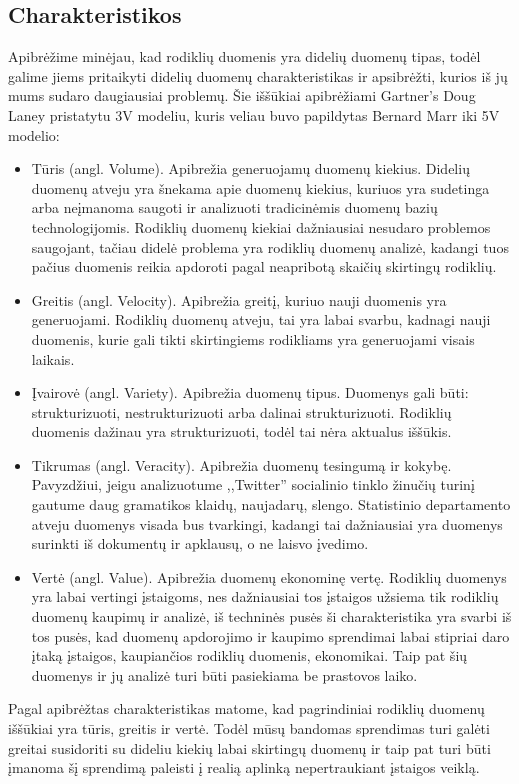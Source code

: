 \documentclass{VUMIFPSkursinis}
\begin{document}
\subsection{Charakteristikos}

Apibrėžime minėjau, kad rodiklių duomenis yra didelių duomenų tipas, todėl galime jiems pritaikyti didelių duomenų charakteristikas ir apsibrėžti, kurios iš jų 
mums sudaro daugiausiai problemų. Šie iššūkiai apibrėžiami Gartner's Doug Laney pristatytu 3V modeliu\cite{laney20013d}, kuris veliau buvo papildytas Bernard Marr iki 5V modelio\cite{marr2014big}:
\begin{itemize}
    \item Tūris (angl. Volume). Apibrežia generuojamų duomenų kiekius. Didelių duomenų atveju yra šnekama apie duomenų kiekius, kuriuos yra sudetinga arba neįmanoma saugoti 
    ir analizuoti tradicinėmis duomenų bazių technologijomis. Rodiklių duomenų kiekiai dažniausiai nesudaro problemos saugojant, tačiau didelė problema yra rodiklių duomenų analizė, 
    kadangi tuos pačius duomenis reikia apdoroti pagal neapribotą skaičių skirtingų rodiklių.
    \item Greitis (angl. Velocity). Apibrežia greitį, kuriuo nauji duomenis yra generuojami. Rodiklių duomenų atveju, tai yra labai svarbu, kadnagi nauji duomenis, kurie gali 
    tikti skirtingiems rodikliams yra generuojami visais laikais.
    \item Įvairovė (angl. Variety). Apibrežia duomenų tipus. Duomenys gali būti: strukturizuoti, nestrukturizuoti arba dalinai strukturizuoti\cite{zikopoulos2011understanding}. 
    Rodiklių duomenis dažinau yra strukturizuoti, todėl tai nėra aktualus iššūkis.
    \item Tikrumas (angl. Veracity). Apibrežia duomenų tesingumą ir kokybę. Pavyzdžiui, jeigu analizuotume ,,Twitter'' socialinio tinklo žinučių turinį gautume daug gramatikos klaidų, naujadarų, slengo. 
    Statistinio departamento atveju duomenys visada bus tvarkingi, kadangi tai dažniausiai yra duomenys surinkti iš dokumentų ir apklausų, o ne laisvo įvedimo.
    \item Vertė (angl. Value). Apibrežia duomenų ekonominę vertę. Rodiklių duomenys yra labai vertingi įstaigoms, nes dažniausiai tos įstaigos užsiema tik rodiklių duomenų kaupimų ir analizė, iš techninės pusės
    ši charakteristika yra svarbi iš tos pusės, kad duomenų apdorojimo ir kaupimo sprendimai labai stipriai daro įtaką įstaigos, kaupiančios rodiklių duomenis, ekonomikai. Taip pat šių duomenys ir jų 
    analizė turi būti pasiekiama be prastovos laiko.
\end{itemize}
    Pagal apibrėžtas charakteristikas matome, kad pagrindiniai rodiklių duomenų iššūkiai yra tūris, greitis ir vertė. Todėl mūsų bandomas sprendimas turi galėti greitai susidoriti su dideliu kiekių 
labai skirtingų duomenų ir taip pat turi būti įmanoma šį sprendimą paleisti į realią aplinką nepertraukiant įstaigos veiklą.
\end{document}
